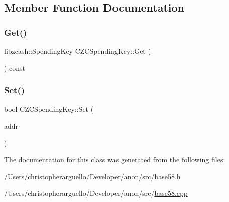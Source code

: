 \subsection{Member Function Documentation}
\mbox{\label{class_c_z_c_spending_key_ab1dfdc5b045b63f0635eaa5904a59f7d}} 
\subsubsection{\texorpdfstring{Get()}{Get()}}
{\footnotesize\ttfamily libzcash\+::\+Spending\+Key C\+Z\+C\+Spending\+Key\+::\+Get (\begin{DoxyParamCaption}{ }\end{DoxyParamCaption}) const}

\mbox{\label{class_c_z_c_spending_key_ab91e15b8861b065869ebce8f3ec9e456}} 
\subsubsection{\texorpdfstring{Set()}{Set()}}
{\footnotesize\ttfamily bool C\+Z\+C\+Spending\+Key\+::\+Set (\begin{DoxyParamCaption}\item[{const libzcash\+::\+Spending\+Key \&}]{addr }\end{DoxyParamCaption})}



The documentation for this class was generated from the following files\+:\begin{DoxyCompactItemize}
\item 
/\+Users/christopherarguello/\+Developer/anon/src/\mbox{\hyperlink{base58_8h}{base58.\+h}}\item 
/\+Users/christopherarguello/\+Developer/anon/src/\mbox{\hyperlink{base58_8cpp}{base58.\+cpp}}\end{DoxyCompactItemize}
